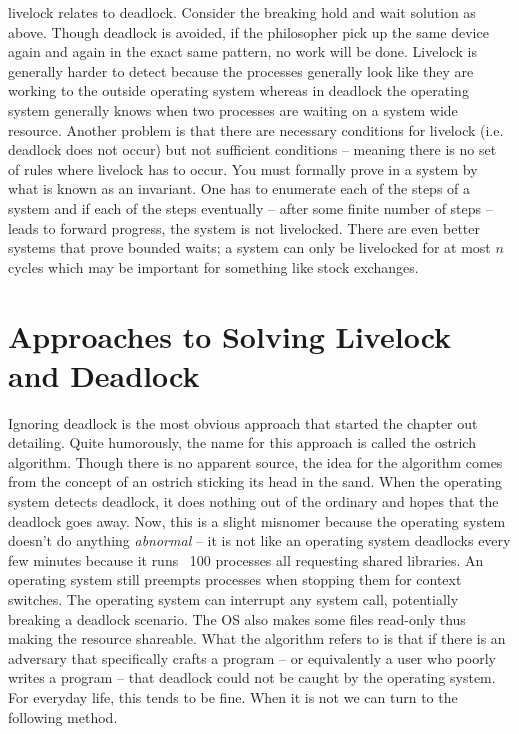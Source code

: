 \gls{livelock} relates to deadlock.
Consider the breaking hold and wait solution as above.
Though deadlock is avoided, if the philosopher pick up the same device again and again in the exact same pattern, no work will be done.
Livelock is generally harder to detect because the processes generally look like they are working to the outside operating system whereas in deadlock the operating system generally knows when two processes are waiting on a system wide resource.
Another problem is that there are necessary conditions for livelock (i.e. deadlock does not occur) but not sufficient conditions -- meaning there is no set of rules where livelock has to occur.
You must formally prove in a system by what is known as an invariant.
One has to enumerate each of the steps of a system and if each of the steps eventually -- after some finite number of steps -- leads to forward progress, the system is not livelocked.
There are even better systems that prove bounded waits; a system can only be livelocked for at most $n$ cycles which may be important for something like stock exchanges.

\section{Approaches to Solving Livelock and Deadlock}

Ignoring deadlock is the most obvious approach that started the chapter out detailing.
Quite humorously, the name for this approach is called the \gls{ostrich algorithm}.
Though there is no apparent source, the idea for the algorithm comes from the concept of an ostrich sticking its head in the sand.
When the operating system detects deadlock, it does nothing out of the ordinary and hopes that the deadlock goes away.
Now, this is a slight misnomer because the operating system doesn't do anything \textit{abnormal} -- it is not like an operating system deadlocks every few minutes because it runs ~100 processes all requesting shared libraries.
An operating system still preempts processes when stopping them for context switches.
The operating system can interrupt any system call, potentially breaking a deadlock scenario.
The OS also makes some files read-only thus making the resource shareable.
What the algorithm refers to is that if there is an adversary that specifically crafts a program -- or equivalently a user who poorly writes a program -- that deadlock could not be caught by the operating system.
For everyday life, this tends to be fine.
When it is not we can turn to the following method.

